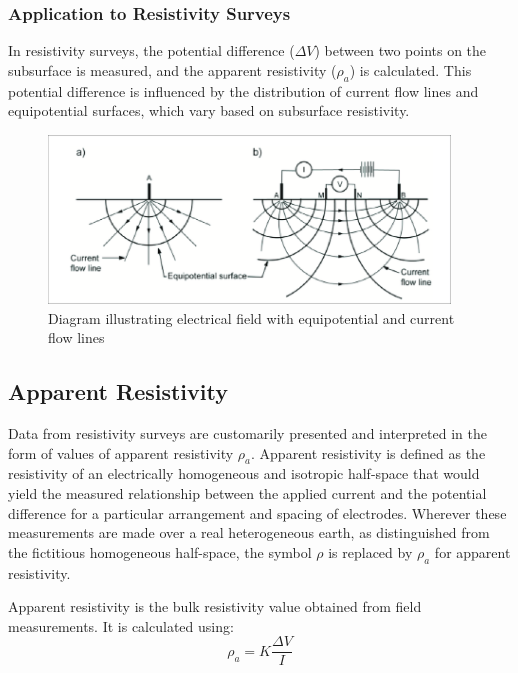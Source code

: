 \documentclass[12pt,a4paper]{report}
\begin{document}
\subsubsection{Application to Resistivity Surveys}
In resistivity surveys, the potential difference (\(\Delta V\)) between two points on the subsurface is measured, and the apparent resistivity (\(\rho_a\)) is calculated. This potential difference is influenced by the distribution of current flow lines and equipotential surfaces, which vary based on subsurface resistivity.


\begin{figure}[h]
    \centering
    \includegraphics[width=0.95\textwidth]{Simplified-current-flow-lines-and-equipotential-surfaces-arising-from-a-a-single.png}
    \caption{Diagram illustrating electrical field with equipotential and current flow lines}
\end{figure}

\subsection{Apparent Resistivity}
Data from resistivity surveys are customarily presented and interpreted in the form of values of apparent resistivity \(\rho_a\). Apparent resistivity is defined as the resistivity of an electrically homogeneous and isotropic half-space that would yield the measured relationship between the applied current and the potential difference for a particular arrangement and spacing of electrodes. Wherever these measurements are made over a real heterogeneous earth, as distinguished from the fictitious homogeneous half-space, the symbol \(\rho\) is replaced by \(\rho_a\) for apparent resistivity.

Apparent resistivity is the bulk resistivity value obtained from field measurements. It is calculated using:
\begin{equation}
\rho_a = K \frac{\Delta V}{I}
\end{equation}
\end{document}
